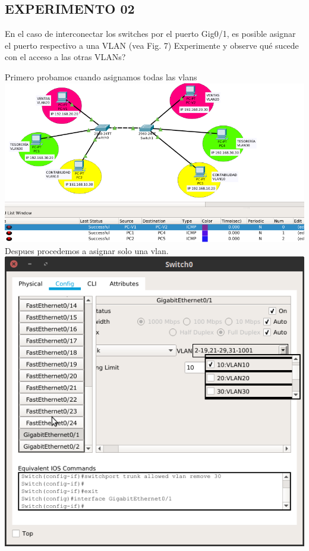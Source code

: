 \subsection{EXPERIMENTO 02}
\begin{definicion}[]{
En el caso de interconectar los switches por el puerto
Gig0/1, es posible asignar el puerto respectivo a una VLAN
(vea Fig. 7) Experimente y observe qu\'e sucede con el acceso
a las otras VLANs?
}
\end{definicion}
Primero probamos cuando asignamos todas las vlans\\
\includegraphics[scale=0.5]{img/primero.png} 
\\ Despues procedemos a asignar solo una vlan.\\
\includegraphics[scale=0.5]{img/vlanconf.png} 
